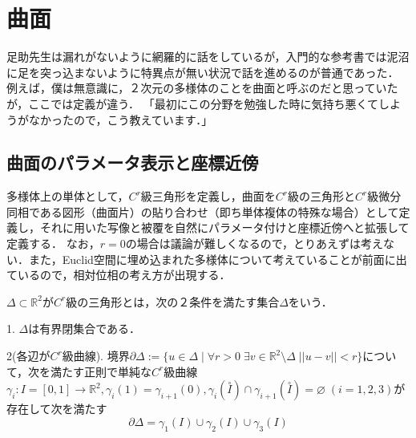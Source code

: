 \documentclass[uplatex, dvipdfmx]{jsreport}
\begin{document}
\chapter{曲面}

足助先生は漏れがないように網羅的に話をしているが，入門的な参考書では泥沼に足を突っ込まないように特異点が無い状況で話を進めるのが普通であった．
例えば，僕は無意識に，２次元の多様体のことを曲面と呼ぶのだと思っていたが，ここでは定義が違う．
「最初にこの分野を勉強した時に気持ち悪くてしようがなかったので，こう教えています．」

\section{曲面のパラメータ表示と座標近傍}

多様体上の単体として，$C^r$級三角形を定義し，曲面を$C^r$級の三角形と$C^r$級微分同相である図形（曲面片）の貼り合わせ（即ち単体複体の特殊な場合）として定義し，それに用いた写像と被覆を自然にパラメータ付けと座標近傍へと拡張して定義する．
なお，$r=0$の場合は議論が難しくなるので，とりあえずは考えない．また，Euclid空間に埋め込まれた多様体について考えていることが前面に出ているので，相対位相の考え方が出現する．

\begin{definition}[$C^r$級三角形]
    $\Delta\subset\mathbb{R}^2$が$C^r$級の三角形とは，次の２条件を満たす集合$\Delta$をいう．

    1. $\Delta$は有界閉集合である．

    2(各辺が$C^r$級曲線). 境界$\partial\Delta:=\{ u\in\Delta\mid\forall r>0\;\exists v\in\mathbb{R}^2\setminus\Delta\; ||u-v||<r \}$について，次を満たす正則で単純な$C^r$級曲線$\gamma_i:I=[0,1]\to\mathbb{R}^2, \gamma_i(1)=\gamma_{i+1}(0), \gamma_i(\overset{\circ}{I})\cap\gamma_{i+1}(\overset{\circ}{I})=\varnothing\;(i=1,2,3)$が存在して次を満たす
    \[ \partial\Delta = \gamma_1(I)\cup\gamma_2(I)\cup\gamma_3(I) \]
\end{definition}
\end{document}
